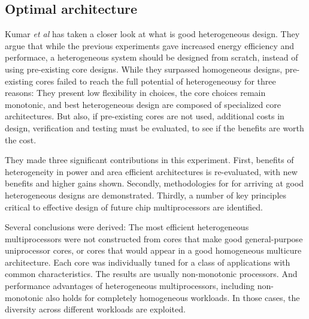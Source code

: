 \subsection{Optimal architecture}
\label{subsec:rw_arch}
Kumar \textit{et al}\cite{heterogeneous-arch} has taken a closer look at what is good heterogeneous design.
They argue that while the previous experiments gave increased energy efficiency and performace, a heterogeneous system should be designed from scratch, instead of using pre-existing core designs.
While they surpassed homogeneous designs, pre-existing cores failed to reach the full potential of heterogeneousy for three reasons: They present low flexibility in choices, the core choices remain monotonic, and best heterogeneous design are composed of specialized core architectures\cite{heterogeneous-arch}.
But also, if pre-existing cores are not used, additional costs in design, verification and testing must be evaluated, to see if the benefits are worth the cost.

They made three significant contributions in this experiment. 
First, benefits of heterogeneity in power and area efficient architectures is re-evaluated, with new benefits and higher gains shown.
Secondly, methodologies for for arriving at good heterogeneous designs are demonstrated.
Thirdly, a number of key principles critical to effective design of future chip multiprocessors are identified.

Several conclusions were derived:
The most efficient heterogeneous multiprocessors were not constructed from cores that make good general-purpose uniprocessor cores, or cores that would appear in a good homogeneous multicure architecture.
Each core was individually tuned for a class of applications with common characteristics.
The results are usually non-monotonic processors.
And performance advantages of heterogeneous multiprocessors, including non-monotonic also holds for completely homogeneous workloads.
In those cases, the diversity across different workloads are exploited.



